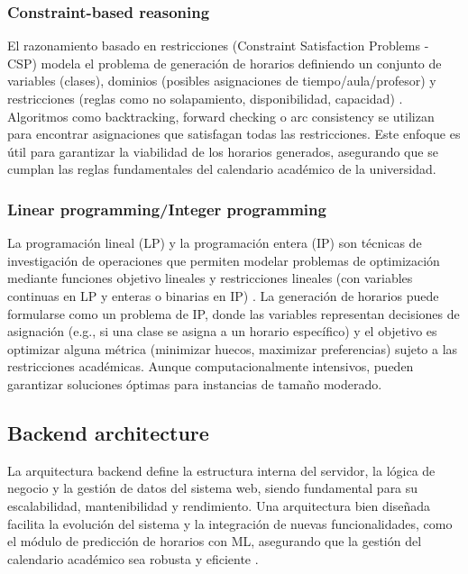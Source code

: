 \subsubsection{Constraint-based reasoning}
El razonamiento basado en restricciones (Constraint Satisfaction Problems - CSP) modela el problema de generación de horarios definiendo un conjunto de variables (clases), dominios (posibles asignaciones de tiempo/aula/profesor) y restricciones (reglas como no solapamiento, disponibilidad, capacidad) \parencite{Rossi2006}. Algoritmos como backtracking, forward checking o arc consistency se utilizan para encontrar asignaciones que satisfagan todas las restricciones. Este enfoque es útil para garantizar la viabilidad de los horarios generados, asegurando que se cumplan las reglas fundamentales del calendario académico de la universidad.

\subsubsection{Linear programming/Integer programming}
La programación lineal (LP) y la programación entera (IP) son técnicas de investigación de operaciones que permiten modelar problemas de optimización mediante funciones objetivo lineales y restricciones lineales (con variables continuas en LP y enteras o binarias en IP) \parencite{Winston2004}. La generación de horarios puede formularse como un problema de IP, donde las variables representan decisiones de asignación (e.g., si una clase se asigna a un horario específico) y el objetivo es optimizar alguna métrica (minimizar huecos, maximizar preferencias) sujeto a las restricciones académicas. Aunque computacionalmente intensivos, pueden garantizar soluciones óptimas para instancias de tamaño moderado.

\subsection{Backend architecture}
La arquitectura backend define la estructura interna del servidor, la lógica de negocio y la gestión de datos del sistema web, siendo fundamental para su escalabilidad, mantenibilidad y rendimiento. Una arquitectura bien diseñada facilita la evolución del sistema y la integración de nuevas funcionalidades, como el módulo de predicción de horarios con ML, asegurando que la gestión del calendario académico sea robusta y eficiente \parencite{Richards2015}.

